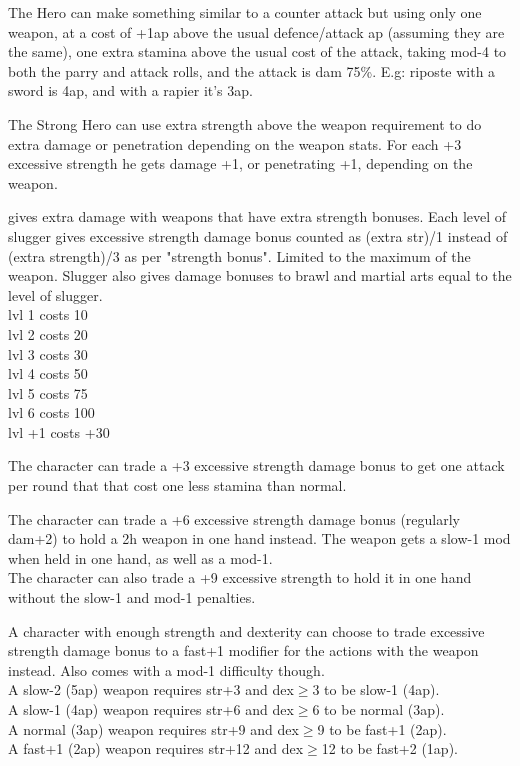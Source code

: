  The Hero can make something similar to a counter attack but using only one weapon, at a cost of +1ap above the usual defence/attack ap (assuming they are the same), one extra stamina above the usual cost of the attack, taking mod-4 to both the parry and attack rolls, and the attack is dam 75\%. E.g: riposte with a sword is 4ap, and with a rapier it's 3ap.


 The Strong Hero can use extra strength above the weapon requirement to do extra damage or penetration depending on the weapon stats. For each +3 excessive strength he gets damage +1, or penetrating +1, depending on the weapon.


 gives extra damage with weapons that have extra strength bonuses. Each level of slugger gives excessive strength damage bonus counted as (extra str)/1 instead of (extra strength)/3 as per "strength bonus". Limited to the maximum of the weapon. Slugger also gives damage bonuses to brawl and martial arts equal to the level of slugger. \\
lvl  1  costs  10 \\
lvl  2  costs  20 \\
lvl  3  costs  30 \\
lvl  4  costs  50 \\
lvl  5  costs  75 \\
lvl  6  costs 100 \\
lvl +1  costs +30


 The character can trade a +3 excessive strength damage bonus to get one attack per round that that cost one less stamina than normal.


 The character can trade a +6 excessive strength damage bonus (regularly dam+2) to hold a 2h weapon in one hand instead. The weapon gets a slow-1 mod when held in one hand, as well as a mod-1. \\
The character can also trade a +9 excessive strength to hold it in one hand without the slow-1 and mod-1 penalties.


 A character with enough strength and dexterity can choose to trade excessive strength damage bonus to a fast+1 modifier for the actions with the weapon instead. Also comes with a mod-1 difficulty though. \\
A slow-2 (5ap) weapon requires str+3 and dex$\geq$3 to be slow-1 (4ap).\\
A slow-1 (4ap) weapon requires str+6 and dex$\geq$6 to be normal (3ap).\\
A normal (3ap) weapon requires str+9 and dex$\geq$9 to be fast+1 (2ap).\\
A fast+1 (2ap) weapon requires str+12 and dex$\geq$12 to be fast+2 (1ap).


